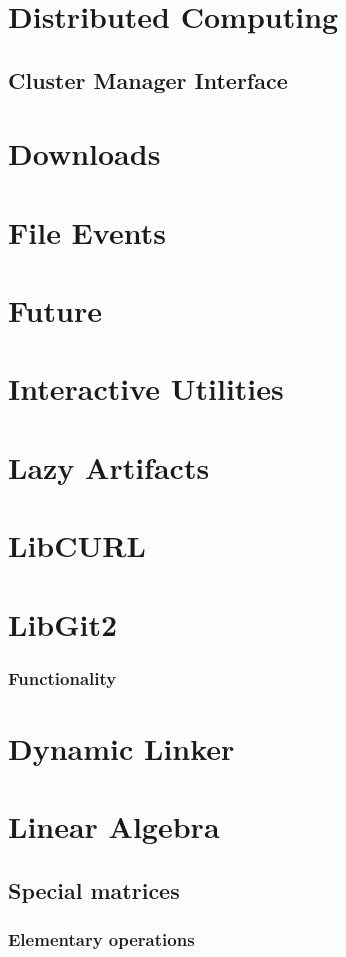   \chapter{Distributed Computing}
    \section{Cluster Manager Interface}
  \chapter{Downloads}
  \chapter{File Events}
  \chapter{Future}
  \chapter{Interactive Utilities}
  \chapter{Lazy Artifacts}
  \chapter{LibCURL}
  \chapter{LibGit2}
    \subsection{Functionality}
  \chapter{Dynamic Linker}
  \chapter{Linear Algebra}
    \section{Special matrices}
    \subsection{Elementary operations}
